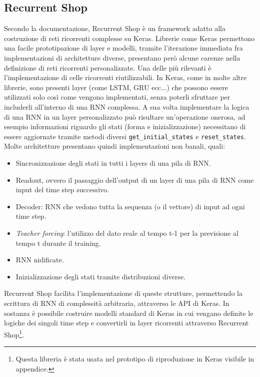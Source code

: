 \subsection{Recurrent Shop}
Secondo la documentazione\cite{recurrentshop}, Recurrent Shop è un framework adatto alla costruzione di reti ricorrenti complesse su Keras. Librerie come Keras permettono una facile prototipazione di layer e modelli, tramite l'iterazione immediata fra implementazioni di architetture diverse, presentano però alcune carenze nella definizione di reti ricorrenti personalizzate. Una delle più rilevanti è l'implementazione di celle ricorrenti riutilizzabili. In Keras, come in molte altre librerie, sono presenti layer (come LSTM, GRU ecc...) che possono essere utilizzati solo così come vengono implementati, senza poterli sfruttare per includerli all'interno di una RNN complessa. A sua volta implementare la logica di una RNN in un layer personalizzato può risultare un'operazione onerosa, ad esempio informazioni riguardo gli stati (forma e inizializzazione) necessitano di essere aggiornate tramite metodi diversi \lstinline{get_initial_states} e \lstinline{reset_states}. Molte architetture presentano quindi implementazioni non banali, quali:
\begin{itemize}
	\item Sincronizzazione degli stati in tutti i layers di una pila di RNN.
	\item Readout, ovvero il passaggio dell'output di un layer di una pila di RNN come input del time step successivo.
	\item Decoder: RNN che vedono tutta la sequenza (o il vettore) di input ad ogni time step.
	\item \textit{Teacher forcing}: l'utilizzo del dato reale al tempo t-1 per la previsione al tempo t durante il training.
	\item RNN nidificate.
	\item Inizializzazione degli stati tramite distribuzioni diverse.
\end{itemize}

Recurrent Shop facilita l'implementazione di queste strutture, permettendo la scrittura di RNN di complessità arbitraria, attraverso le API di Keras. In sostanza è possibile costruire modelli standard di Keras in cui vengano definite le logiche dei singoli time step e convertirli in layer ricorrenti attraverso Recurrent Shop\footnote{Questa libreria è stata usata nel prototipo di riproduzione in Keras visibile in appendice.}.
